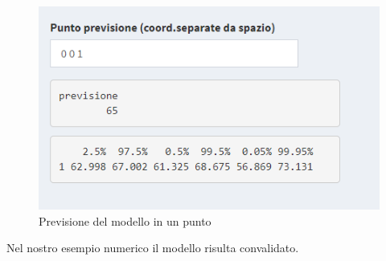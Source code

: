 \documentclass[
]{book}
\begin{document}
\begin{figure}

{\centering \includegraphics[width=1\linewidth]{Immagini/13_prev} 

}

\caption{Previsione del modello in un punto\label{fig13}}\label{fig:unnamed-chunk-17}
\end{figure}

Nel nostro esempio numerico il modello risulta convalidato.

  
\end{document}
